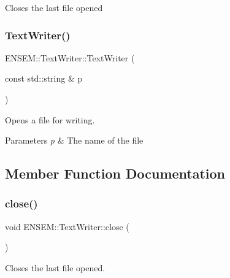 Closes the last file opened \mbox{\label{classENSEM_1_1TextWriter_abbaa16dfaccb062fc8cea4ce2abf3215}} 
\subsubsection{\texorpdfstring{TextWriter()}{TextWriter()}\hspace{0.1cm}{\footnotesize\ttfamily [6/6]}}
{\footnotesize\ttfamily E\+N\+S\+E\+M\+::\+Text\+Writer\+::\+Text\+Writer (\begin{DoxyParamCaption}\item[{const std\+::string \&}]{p }\end{DoxyParamCaption})\hspace{0.3cm}{\ttfamily [explicit]}}

Opens a file for writing. 
\begin{DoxyParams}{Parameters}
{\em p} & The name of the file \\
\hline
\end{DoxyParams}


\subsection{Member Function Documentation}
\mbox{\label{classENSEM_1_1TextWriter_a8b65ccb4936fe8b05492e4f30983b7ee}} 
\subsubsection{\texorpdfstring{close()}{close()}\hspace{0.1cm}{\footnotesize\ttfamily [1/3]}}
{\footnotesize\ttfamily void E\+N\+S\+E\+M\+::\+Text\+Writer\+::close (\begin{DoxyParamCaption}{ }\end{DoxyParamCaption})}



Closes the last file opened. 

